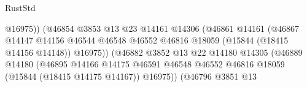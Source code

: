 \begin{lexlean}{RustStd}
\begin{coremodule}
                                                        @16975))
                                                    (@46854
                                                      @3853
                                                      @13
                                                      @23
                                                      @14161
                                                      @14306
                                                      (@46861
                                                        @14161
                                                        (@46867
                                                          @14147
                                                          @14156
                                                          @46544
                                                          @46548
                                                          @46552
                                                          @46816
                                                          @18059
                                                          (@15844 (@18415 @14156 @14148))
                                                          @16975))
                                                      (@46882
                                                        @3852
                                                        @13
                                                        @22
                                                        @14180
                                                        @14305
                                                        (@46889
                                                          @14180
                                                          (@46895
                                                            @14166
                                                            @14175
                                                            @46591
                                                            @46548
                                                            @46552
                                                            @46816
                                                            @18059
                                                            (@15844 (@18415 @14175 @14167))
                                                            @16975))
                                                        (@46796
                                                          @3851
                                                          @13

\end{coremodule}
\end{lexlean}
